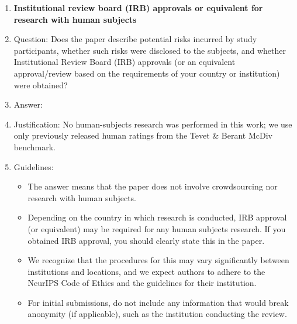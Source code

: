 \begin{enumerate}
\item {\bf Institutional review board (IRB) approvals or equivalent for research with human subjects}
    \item[] Question: Does the paper describe potential risks incurred by study participants, whether such risks were disclosed to the subjects, and whether Institutional Review Board (IRB) approvals (or an equivalent approval/review based on the requirements of your country or institution) were obtained?
    \item[] Answer: \answerNA{}
    \item[] Justification: No human-subjects research was performed in this work; we use only previously released human ratings from the Tevet \& Berant McDiv benchmark.
    \item[] Guidelines:
    \begin{itemize}
        \item The answer \answerNA{} means that the paper does not involve crowdsourcing nor research with human subjects.
        \item Depending on the country in which research is conducted, IRB approval (or equivalent) may be required for any human subjects research. If you obtained IRB approval, you should clearly state this in the paper.
        \item We recognize that the procedures for this may vary significantly between institutions and locations, and we expect authors to adhere to the NeurIPS Code of Ethics and the guidelines for their institution.
        \item For initial submissions, do not include any information that would break anonymity (if applicable), such as the institution conducting the review.
    \end{itemize}


\end{enumerate}
